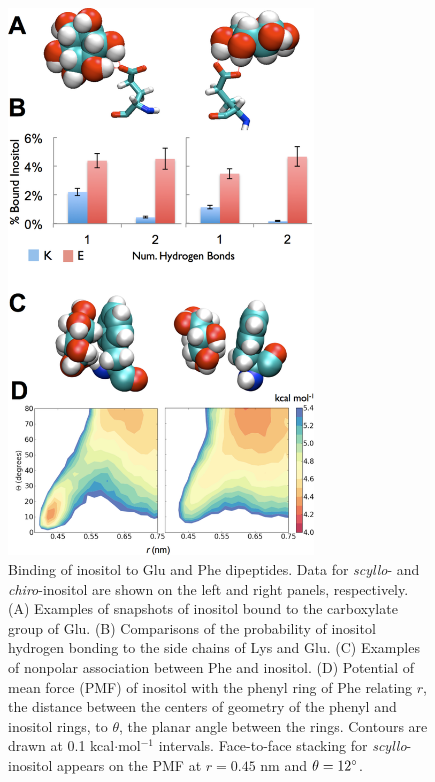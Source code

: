 \begin{figure}
\includegraphics[width=3.185in]{figures/results2/inos2_figures_monomer_residues_pmf_color.pdf}
\caption[Binding of inositol to Glu and Phe dipeptides]{Binding of inositol to Glu and Phe dipeptides. Data for \emph{scyllo}- and \emph{chiro}-inositol are shown on the left and right panels, respectively. (A) Examples of snapshots of inositol bound to the carboxylate group of Glu. (B) Comparisons of the probability of inositol hydrogen bonding to the side chains of Lys and Glu. (C) Examples of nonpolar association between Phe and inositol. (D) Potential of mean force (PMF) of inositol with the phenyl ring of Phe relating $r$, the distance between the centers of geometry of the phenyl and inositol rings, to $\theta$, the planar angle between the rings. Contours are drawn at 0.1 kcal$\cdot$mol$^{-1}$ intervals. Face-to-face stacking for \emph{scyllo}-inositol appears on the PMF at $r=0.45$ nm and $\theta=12^\circ$.}
\label{fig:monomers_glu_phe}
\end{figure}


